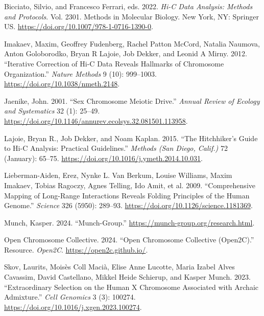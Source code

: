 \documentclass[
  11pt,
  a4paper,
]{scrbook}
\newlength{\cslhangindent}
\newenvironment{CSLReferences}[2] %
 {\begin{list}{}{%
  \setlength{\itemindent}{0pt}
  \setlength{\leftmargin}{0pt}
  \setlength{\parsep}{0pt}
  \ifodd #1
   \setlength{\leftmargin}{\cslhangindent}
   \setlength{\itemindent}{-1\cslhangindent}
  \fi
  \setlength{\itemsep}{#2\baselineskip}}}
 {\end{list}}
\let\oldemph\emph
\renewcommand\emph[1]{\oldemph{\color{gray}#1}}
\begin{document}
\label{refs}
\begin{CSLReferences}{1}{0}
Bicciato, Silvio, and Francesco Ferrari, eds. 2022. \emph{Hi-{C} {Data}
{Analysis}: {Methods} and {Protocols}}. Vol. 2301. Methods in
{Molecular} {Biology}. New York, NY: Springer US.
\url{https://doi.org/10.1007/978-1-0716-1390-0}.

Imakaev, Maxim, Geoffrey Fudenberg, Rachel Patton McCord, Natalia
Naumova, Anton Goloborodko, Bryan R Lajoie, Job Dekker, and Leonid A
Mirny. 2012. {``Iterative Correction of {Hi}-{C} Data Reveals Hallmarks
of Chromosome Organization.''} \emph{Nature Methods} 9 (10): 999--1003.
\url{https://doi.org/10.1038/nmeth.2148}.

Jaenike, John. 2001. {``Sex {Chromosome} {Meiotic} {Drive}.''}
\emph{Annual Review of Ecology and Systematics} 32 (1): 25--49.
\url{https://doi.org/10.1146/annurev.ecolsys.32.081501.113958}.

Lajoie, Bryan R., Job Dekker, and Noam Kaplan. 2015. {``The
{Hitchhiker}'s {Guide} to {Hi}-{C} {Analysis}: {Practical}
Guidelines.''} \emph{Methods (San Diego, Calif.)} 72 (January): 65--75.
\url{https://doi.org/10.1016/j.ymeth.2014.10.031}.

Lieberman-Aiden, Erez, Nynke L. Van Berkum, Louise Williams, Maxim
Imakaev, Tobias Ragoczy, Agnes Telling, Ido Amit, et al. 2009.
{``Comprehensive {Mapping} of {Long}-{Range} {Interactions} {Reveals}
{Folding} {Principles} of the {Human} {Genome}.''} \emph{Science} 326
(5950): 289--93. \url{https://doi.org/10.1126/science.1181369}.

Munch, Kasper. 2024. {``Munch-Group.''}
\url{https://munch-group.org/research.html}.

Open Chromosome Collective. 2024. {``Open {Chromosome} {Collective}
({Open2C}).''} Resource. \emph{Open2C}. \url{https://open2c.github.io/}.

Skov, Laurits, Moisès Coll Macià, Elise Anne Lucotte, Maria Izabel Alves
Cavassim, David Castellano, Mikkel Heide Schierup, and Kasper Munch.
2023. {``Extraordinary Selection on the Human {X} Chromosome Associated
with Archaic Admixture.''} \emph{Cell Genomics} 3 (3): 100274.
\url{https://doi.org/10.1016/j.xgen.2023.100274}.


\end{CSLReferences}
\end{document}

